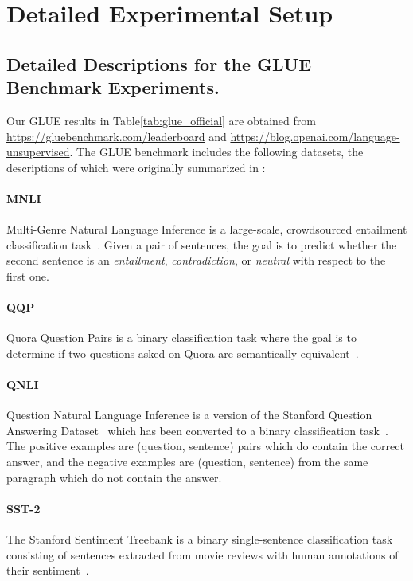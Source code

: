 \documentclass[11pt,a4paper]{article}
\begin{document}
\section{Detailed Experimental Setup}
\label{appendix:sec:exp_details}

\subsection{Detailed Descriptions for the GLUE Benchmark Experiments.}
\label{appendix:sec:glue}

Our GLUE results in Table\ref{tab:glue_official} are obtained from  \url{https://gluebenchmark.com/leaderboard} and \url{https://blog.openai.com/language-unsupervised}.
The GLUE benchmark includes the following datasets, the descriptions of which were originally summarized in \citet{wang-etal:2018:_glue}:

\paragraph{MNLI} Multi-Genre Natural Language Inference is a large-scale, crowdsourced entailment classification task~\cite{williams-nangia-bowman:2018}. Given a pair of sentences, the goal is to predict whether the second sentence is an {\it entailment}, {\it contradiction}, or {\it neutral} with respect to the first one.

\paragraph{QQP} Quora Question Pairs is a binary classification task where the goal is to determine if two questions asked on Quora are semantically equivalent~\cite{chen-etal:2018:_quora}.

\paragraph{QNLI} Question Natural Language Inference is a version of the Stanford Question Answering Dataset~\cite{rajpurkar-etal:2016:_squad} which has been converted to a binary classification task~\cite{wang-etal:2018:_glue}. The positive examples are (question, sentence) pairs which do contain the correct answer, and the negative examples are (question, sentence) from the same paragraph which do not contain the answer.

\paragraph{SST-2} The Stanford Sentiment Treebank is a binary single-sentence classification task consisting of sentences extracted from movie reviews with human annotations of their sentiment~\cite{socher-etal:2013:_recur}.
\end{document}
